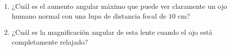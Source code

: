 \item \begin{enumerate}
    \item ¿Cuál es el aumento angular máximo que puede ver claramente un ojo humano normal con una lupa de distancia focal de $10\text{ cm}$?
    \item ¿Cuál es la magnificación angular de esta lente cuando el ojo está completamente relajado?
\end{enumerate}